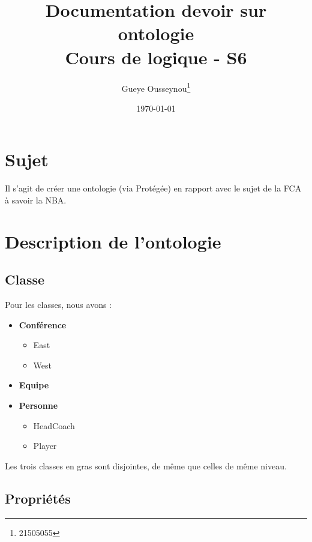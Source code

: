\documentclass[a4paper,11pt]{article}
\author{Gueye Ousseynou\thanks{21505055}}
\date{\today}
\title{\textbf{Documentation devoir sur ontologie} \\ Cours de logique - S6}
\begin{document}
\maketitle
\setcounter{tocdepth}{3}
\tableofcontents

\section{Sujet}
\label{sec-1}

Il s'agit de créer une ontologie (via Protégée) en rapport avec le sujet de la FCA à savoir la NBA.

\section{Description de l'ontologie}
\label{sec-2}

\subsection{Classe}
Pour les classes, nous avons :
\begin{itemize}
    \item \textbf{Conférence}
        \begin{itemize}
            \item {East}
            \item {West}
        \end{itemize}
    \item \textbf{Equipe}
    \item \textbf{Personne}
        \begin{itemize}
            \item HeadCoach
            \item Player \\
        \end{itemize}
\end{itemize}

Les trois classes en gras sont disjointes, de même que celles de même niveau.

\newpage
\subsection{Propriétés}
\end{document}
